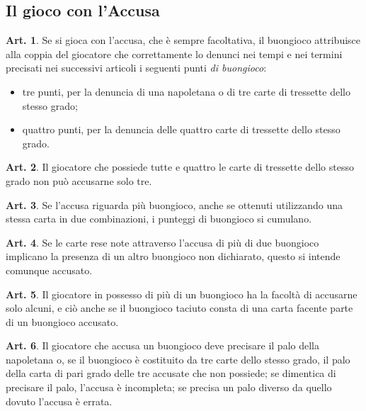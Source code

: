 \documentclass[italian,a4paper]{book}
\theoremstyle{definition}
\newtheorem{art}{Art.}
\newenvironment{packeditem}{
\begin{itemize}
  \setlength{\itemsep}{1pt}
  \setlength{\parskip}{0pt}
  \setlength{\parsep}{0pt}
}{\end{itemize}}
\begin{document}
\subsection{Il gioco con l'Accusa}
\begin{art}\label{buongioco}
Se si gioca con l'accusa, che è sempre facoltativa, il buongioco attribuisce
alla coppia del giocatore che correttamente lo denunci nei tempi e nei
termini precisati nei successivi articoli i seguenti punti \emph{di buongioco}:
\begin{packeditem}
\item    tre punti, per la denuncia di una napoletana o di tre carte di tressette dello stesso grado;
\item    quattro punti, per la denuncia delle quattro carte di tressette dello stesso grado.
    \end{packeditem}
\end{art}
\begin{art}
Il giocatore che possiede tutte e quattro le carte di tressette dello stesso grado non può accusarne solo tre.
\end{art}
\begin{art}
Se l'accusa riguarda più buongioco, anche se ottenuti utilizzando una stessa carta in due combinazioni, i punteggi di buongioco si cumulano.
\end{art}
\begin{art}
Se le carte rese note attraverso l'accusa di più di due buongioco implicano la presenza di un altro buongioco non dichiarato, questo si intende comunque accusato.
\end{art}
\begin{art}
Il giocatore in possesso di più di un buongioco ha la facoltà di accusarne solo alcuni, e ciò anche se il buongioco taciuto consta di una carta facente parte di un buongioco accusato.
\end{art}
\begin{art}
Il giocatore che accusa un buongioco deve precisare il palo della napoletana o, se il buongioco è costituito da tre carte dello stesso grado, il palo della carta di pari grado delle tre accusate che non possiede; se dimentica di precisare il palo, l'accusa è incompleta; se precisa un palo diverso da quello dovuto l'accusa è errata.
\end{art}
\end{document}
